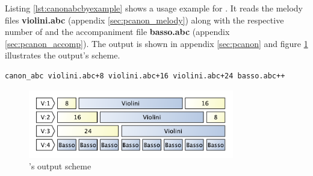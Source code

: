 


Listing \ref{lst:canonabcbyexample} shows a usage example for \canonabc{}. It reads the melody files
\textbf{violini.abc} (appendix \ref{sec:pcanon_melody}) along with the respective number of
\measurerests{} and the accompaniment file \textbf{basso.abc} (appendix \ref{sec:pcanon_accomp}).
The output is shown in appendix \ref{sec:pcanon} and figure \ref{fig:pcanon_scheme} illustrates the
output's scheme.\\

\begin{lstlisting}[caption={\canonabc{} by example},label={lst:canonabcbyexample},captionpos=t,abovecaptionskip=-\medskipamount]
canon_abc violini.abc+8 violini.abc+16 violini.abc+24 basso.abc++
\end{lstlisting}

\begin{figure}[H]
  \begin{center}
    \includegraphics[width=0.8\textwidth]{img/pcanon_scheme.pdf}
    \caption{\canonabc{}'s output scheme}
    \label{fig:pcanon_scheme}
  \end{center}
\end{figure}
